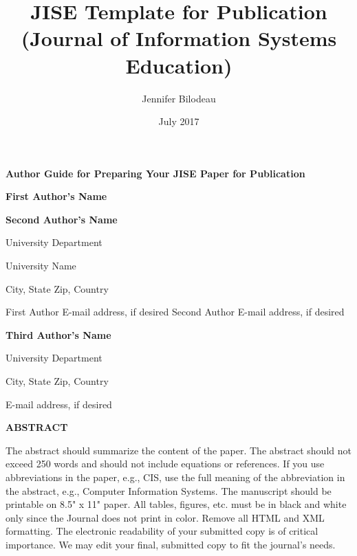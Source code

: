 \documentclass[9pt]{article}
\title{JISE Template for Publication (Journal of Information Systems Education)}
\author{Jennifer Bilodeau}
\date{July 2017}
\begin{document}
\begin{center}
\textbf{{\Huge Author Guide for Preparing Your JISE Paper for Publication}}
\end{center}

\begin{center}
\textbf{{\Large First Author's Name}}
\end{center}

\begin{center}
{\Large \textbf{Second Author's Name}}
\end{center}

\begin{center}
{\Large University Department}
\end{center}

\begin{center}
{\Large University Name}
\end{center}

\begin{center}
{\Large City, State Zip, Country}
\end{center}

\begin{center}
{\Large First Author E-mail address, if desired Second Author E-mail address, if
desired}
\end{center}

\begin{center}
\textbf{{\Large Third Author's Name}}
\end{center}

\begin{center}
{\Large University Department}
\end{center}

\begin{center}
{\Large City, State Zip, Country}
\end{center}

\begin{center}
{\Large E-mail address, if desired}
\end{center}

\begin{center}
\textbf{ABSTRACT}
\end{center}

The abstract should summarize the content of the paper. The abstract should not
exceed 250 words and should not include equations or references. If you use
abbreviations in the paper, e.g., CIS, use the full meaning of the abbreviation
in the abstract, e.g., Computer Information Systems. The manuscript should be
printable on 8.5" x 11" paper. All tables, figures, etc. must be in black and
white only since the Journal does not print in color. Remove all HTML and XML
formatting. The electronic readability of your submitted copy is of critical
importance. We may edit your final, submitted copy to fit the journal's needs.
\end{document}
